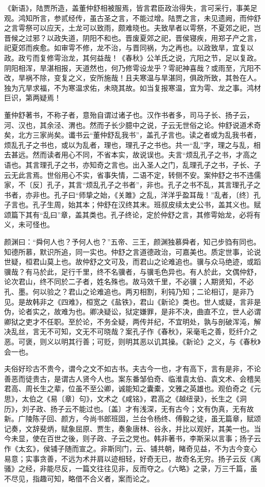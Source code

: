 \documentclass[]{article}
\begin{document}
《新语》，陆贾所造，盖董仲舒相被服焉，皆言君臣政治得失，言可采行，事美足观。鸿知所言，参贰经传，虽古圣之言，不能过增。陆贾之言，未见遗阙，而仲舒之言雩祭可以应天，土龙可以致雨，颇难晓也。夫致旱者以雩祭，不夏郊之祀，岂晋候之过邪？以政失道，阴阳不和也。晋废夏郊之祀，晋侯寝疾，用郑子产之言，祀夏郊而疾愈。如审雩不修，龙不治，与晋同祸，为之再也。以政致旱，宜复以政。政亏而复修雩治龙，其何益哉！《春秋》公羊氏之说，亢阳之节，足以复政。阴阳相浑，旱湛相报，天道然也，何乃修雩设龙乎？雩祀神喜哉？或雨至，亢阳不改，旱祸不除，变复之义，安所施哉！且夫寒温与旱湛同，俱政所致，其咎在人。独为亢旱求福，不为寒温求佑，未晓其故。如当复报寒温，宜为雩、龙之事。鸿材巨识，第两疑焉！

董仲舒著书，不称子者，意殆自谓过诸子也。汉作书者多，司马子长、扬子云，河、汉也，其余泾、渭也。然而子长少臆中之说，子云无世俗之论。仲舒说道术奇矣，北方三家尚矣。谶书云``董仲舒乱我书''，盖孔子言也。读之者或为乱我书者，烦乱孔子之书也，或以为乱者，理也，理孔子之书也。共一``乱''字，理之与乱，相去甚远。然而读者用心不同，不省本实，故说误也。夫言``烦乱孔子之书，才高之语也。其言理孔子之书，亦知奇之言也。出入圣人之门，乱理孔子之书，子长、子云无此言焉。世俗用心不实，省事失情，二语不定，转侧不安。案仲舒之书不违儒家，不〔反〕孔子，其言``烦乱孔子之书者''，非也。孔子之书不乱，其言理孔子之书者，亦非也。孔子曰``师挚之始，《关雎》之乱，洋洋乎盈耳哉！''乱者，〔终〕孔子言也。孔子生周，始其本；仲舒在汉终其末。班叔皮续太史公书，盖其义也。赋颂篇下其有``乱曰''章，盖其类也。孔子终论，定於仲舒之言，其修雩始龙，必将有义，未可怪也。

颜渊曰：``舜何人也？予何人也？''五帝、三王，颜渊独慕舜者，知己步驺有同也。知德所慕，默识所追，同一实也。仲舒之言道德政治，可嘉美也。质定世事，论说世疑，桓君山莫上也。故仲舒之文可及，而君山之论难追也。骥与众马绝迹，或蹈骥哉？有马於此，足行千里，终不名骥者，与骥毛色异也。有人於此，文偶仲舒，论次君山，终不同於二子者，姓名殊也。故马效千里，不必骥；人期贤知，不必孔、墨。何以验之？君山之论难追也。两刃相割，利钝乃知；二论相订，是非乃见。是故韩非之《四难》，桓宽之《盐铁》，君山《新论》类也。世人或疑，言非是伪，论者实之，故难为也。卿决疑讼，狱定嫌罪，是非不决，曲直不立，世人必谓卿狱之吏才不任职。至於论，不务全疑，两传并纪，不宜明处，孰与剖破浑沌，解决乱丝，言无不可知，文无不可晓哉？案孔子作《春秋》，采毫毛之善，贬纤介之恶。可褒，则义以明其行善；可贬，则明其恶以讥其操。《新论》之义，与《春秋》会一也。

夫俗好珍古不贵今，谓今之文不如古书。夫古今一也，才有高下，言有是非，不论善恶而徒贵古，是谓古人贤今人也。案东番邹伯奇、临淮袁太伯、袁文术、会稽吴君高、周长生之辈，位虽不至公卿，诚能知之囊橐，文雅之英雄也。观伯奇之《元思》，太伯之《易〔章〕句》，文术之《咸铭》，君高之《越纽录》，长生之《洞历》，刘子政、扬子云不能过也。〔盖〕才有浅深，无有古今；文有伪真，无有故新。广陵陈子回、颜方，今尚书郎班固，兰台令杨终、傅毅之徒，虽无篇章，赋颂记奏，文辞斐炳，赋象屈原、贾生，奏象唐林、谷永，并比以观好，其美一也。当今未显，使在百世之後，则子政、子云之党也。韩非著书，李斯采以言事；扬子云作《太玄》，侯铺子随而宣之。非斯同门，云、铺共朝，睹奇见益，不为古今变心易意；实事贪善，不远为术并肩以迹相轻，好奇无已，故奇名无穷。扬子云反《离骚》之经，非能尽反，一篇文往往见非，反而夺之。《六略》之录，万三千篇，虽不尽见，指趣可知，略借不合义者，案而论之。
\end{document}
